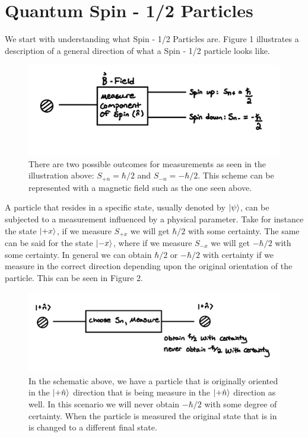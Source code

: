 \documentclass[twocolumn]{article}
\begin{document}
\section*{Quantum Spin - 1/2 Particles}
We start with understanding what Spin - 1/2 Particles are. Figure 1 illustrates a description of a general direction of what a Spin - 1/2 particle looks like.
\begin{figure}[htbp]
\begin{center}
\includegraphics[width=1.00\linewidth]{Spin-In-Magnetic-Field.jpg}
\caption{There are two possible outcomes for measurements as seen in the illustration above: $S_{+n}=\hbar/2$ and $S_{-n}=-\hbar/2$. This scheme can be represented with a magnetic field such as the one seen above.}
\end{center}
\end{figure}
\newline
A particle that resides in a specific state, usually denoted by $\ket{\psi}$, can be subjected to a measurement influenced by a physical parameter. Take for instance the state $\ket{+x}$, if we measure $S_{+x}$ we will get $\hbar/2$ with some certainty. The same can be said for the state $\ket{-x}$, where if we measure $S_{-x}$ we will get $-\hbar/2$ with some certainty. In general we can obtain $\hbar/2$ or $-\hbar/2$ with certainty if we measure in the correct direction depending upon the original orientation of the particle. This can be seen in Figure 2.
\begin{figure}[htbp]
\begin{center}
\includegraphics[width=1.00\linewidth]{Spin-With-Certainty.jpg}
\caption{In the schematic above, we have a particle that is originally oriented in the $\ket{+\hat{n}}$ direction that is being measure in the $\ket{+\hat{n}}$ direction as well. In this scenario we will never obtain $-\hbar/2$ with some degree of certainty. When the particle is measured the original state that is in is changed to a different final state.}
\end{center}
\end{figure}
\end{document}
